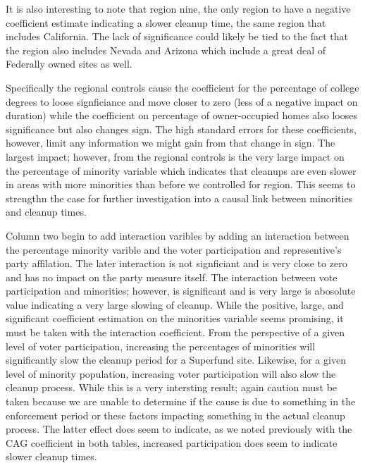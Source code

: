 \documentclass[12pt]{article}
\begin{document}
{It is also interesting to note that region nine, the only region to have a negative coefficient estimate indicating a slower cleanup time, the same region that includes California. The lack of significance could likely be tied to the fact that the region also includes Nevada and Arizona which include a great deal of Federally owned sites as well.

Specifically the regional controls cause the coefficient for the percentage of college degrees to loose signficiance and move closer to zero (less of a negative impact on duration) while the coefficient on percentage of owner-occupied homes also looses significance but also changes sign. The high standard errors for these coefficients, however, limit any information we might gain from that change in sign. The largest impact; however, from the regional controls is the very large impact on the percentage of minority variable which indicates that cleanups are even slower in areas with more minorities than before we controlled for region. This seems to strengthn the case for further investigation into a causal link between minorities and cleanup times. 

Column two begin to add interaction varibles by adding an interaction between the percentage minority varible and the voter participation and representive's party affilation. The later interaction is not signficiant and is very close to zero and has no impact on the party measure itself. The interaction between vote participation and minorities; however, is significant and is very large is abosolute value indicating a very large slowing of cleanup. While the positive, large, and significant coefficient estimation on the minorities variable seems promising, it must be taken with the interaction coefficient. From the perspective of a given level of voter participation, increasing the percentages of minorities will significantly slow the cleanup period for a Superfund site. Likewise, for a given level of minority population, increasing voter participation will also slow the cleanup process. While this is a very intersting result; again caution must be taken because we are unable to determine if the cause is due to something in the enforcement period or these factors impacting something in the actual cleanup process. The latter effect does seem to indicate, as we noted previously with the CAG coefficient in both tables, increased participation does seem to indicate slower cleanup times. 

}
\end{document}
